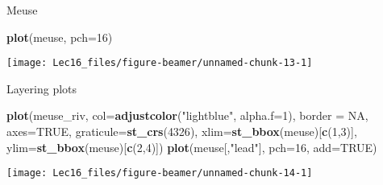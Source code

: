 \documentclass[11pt,ignorenonframetext,]{beamer}
\newenvironment{Shaded}{}{}
\newcommand{\DataTypeTok}[1]{\textcolor[rgb]{0.56,0.13,0.00}{#1}}
\newcommand{\DecValTok}[1]{\textcolor[rgb]{0.25,0.63,0.44}{#1}}
\newcommand{\KeywordTok}[1]{\textcolor[rgb]{0.00,0.44,0.13}{\textbf{#1}}}
\newcommand{\NormalTok}[1]{#1}
\newcommand{\OtherTok}[1]{\textcolor[rgb]{0.00,0.44,0.13}{#1}}
\newcommand{\StringTok}[1]{\textcolor[rgb]{0.25,0.44,0.63}{#1}}
\let\oldShaded\Shaded
\let\endoldShaded\endShaded
\renewenvironment{Shaded}{\footnotesize\begin{spacing}{0.9}\oldShaded}{\endoldShaded\end{spacing}}
\let\oldverbatim\verbatim
\let\endoldverbatim\endverbatim
\newcommand{\scriptoutput}{
  \renewenvironment{Shaded}{\scriptsize\begin{spacing}{0.9}\oldShaded}{\endoldShaded\end{spacing}}
  \renewenvironment{verbatim}{\scriptsize\begin{spacing}{0.9}\oldverbatim}{\endoldverbatim\end{spacing}}
}
\begin{document}
\begin{frame}[fragile,t]{Meuse}
\protect\hypertarget{meuse}{}

\scriptoutput

\begin{Shaded}
\begin{Highlighting}[]
\KeywordTok{plot}\NormalTok{(meuse, }\DataTypeTok{pch=}\DecValTok{16}\NormalTok{)}
\end{Highlighting}
\end{Shaded}

\begin{center}\texttt{[image: Lec16\_files/figure-beamer/unnamed-chunk-13-1]} \end{center}

\end{frame}

\begin{frame}[fragile,t]{Layering plots}
\protect\hypertarget{layering-plots}{}

\scriptoutput

\begin{Shaded}
\begin{Highlighting}[]
\KeywordTok{plot}\NormalTok{(meuse_riv, }\DataTypeTok{col=}\KeywordTok{adjustcolor}\NormalTok{(}\StringTok{"lightblue"}\NormalTok{, }\DataTypeTok{alpha.f=}\DecValTok{1}\NormalTok{), }\DataTypeTok{border =} \OtherTok{NA}\NormalTok{, }
     \DataTypeTok{axes=}\OtherTok{TRUE}\NormalTok{, }\DataTypeTok{graticule=}\KeywordTok{st_crs}\NormalTok{(}\DecValTok{4326}\NormalTok{), }\DataTypeTok{xlim=}\KeywordTok{st_bbox}\NormalTok{(meuse)[}\KeywordTok{c}\NormalTok{(}\DecValTok{1}\NormalTok{,}\DecValTok{3}\NormalTok{)], }\DataTypeTok{ylim=}\KeywordTok{st_bbox}\NormalTok{(meuse)[}\KeywordTok{c}\NormalTok{(}\DecValTok{2}\NormalTok{,}\DecValTok{4}\NormalTok{)])}
\KeywordTok{plot}\NormalTok{(meuse[,}\StringTok{"lead"}\NormalTok{], }\DataTypeTok{pch=}\DecValTok{16}\NormalTok{, }\DataTypeTok{add=}\OtherTok{TRUE}\NormalTok{)}
\end{Highlighting}
\end{Shaded}

\begin{center}\texttt{[image: Lec16\_files/figure-beamer/unnamed-chunk-14-1]} \end{center}

\end{frame}
\end{document}
